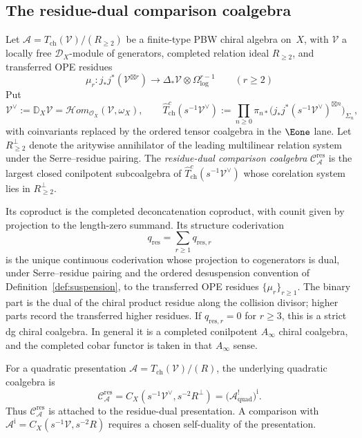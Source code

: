 
\subsection{The residue-dual comparison coalgebra}

\begin{definition}\label{def:koszul-dual-coalgebra}
\label{def:intrinsic-koszul-dual}
\label{def:koszul-dual-chiral}
Let $\mathcal{A}=T_{\mathrm{ch}}(\mathcal{V})/(R_{\geq 2})$ be a
finite-type PBW chiral algebra on~$X$, with $\mathcal{V}$ a locally free
$\mathcal{D}_X$-module of generators, completed relation ideal
$R_{\geq 2}$, and transferred OPE residues
\[
\mu_{r}\colon j_*j^*(\mathcal{V}^{\boxtimes r})
\longrightarrow \Delta_*\mathcal{V}\otimes
\Omega_{\log}^{r-1}
\qquad (r\geq 2)
\]
Put
\[
\mathcal{V}^{\vee}:=\mathbb D_X\mathcal V
=\mathcal{H}om_{\mathcal{O}_X}(\mathcal{V},\omega_X),
\qquad
\widehat{T}^{c}_{\mathrm{ch}}(s^{-1}\mathcal{V}^{\vee})
:=\prod_{n\geq 0}
\pi_{n*}\bigl(j_*j^*(s^{-1}\mathcal{V}^{\vee})^{\boxtimes n}\bigr)_{\Sigma_n},
\]
with coinvariants replaced by the ordered tensor coalgebra in the
$\Eone$ lane.  Let $R_{\geq2}^{\perp}$ denote the aritywise
annihilator of the leading multilinear relation system under the
Serre--residue pairing.  The \emph{residue-dual comparison
coalgebra} $\mathcal C_{\mathcal A}^{\mathrm{res}}$ is the largest
closed conilpotent subcoalgebra of
$\widehat{T}^{c}_{\mathrm{ch}}(s^{-1}\mathcal{V}^{\vee})$ whose
corelation system lies in $R_{\geq2}^{\perp}$.

Its coproduct is the completed deconcatenation coproduct, with counit
given by projection to the length-zero summand. Its structure
coderivation
\[
q_{\mathrm{res}}=\sum_{r\geq 1}q_{\mathrm{res},r}
\]
is the unique continuous coderivation whose projection to cogenerators
is dual, under Serre--residue pairing and the ordered desuspension
convention of Definition~\ref{def:suspension}, to the transferred OPE
residues
$\{\mu_r\}_{r\geq 1}$. The binary part is the dual of the chiral product
residue along the collision divisor; higher parts record the transferred
higher residues. If $q_{\mathrm{res},r}=0$ for $r\geq3$, this is a strict dg chiral
coalgebra. In general it is a completed conilpotent
$A_\infty$ chiral coalgebra, and the completed cobar functor is taken in
that $A_\infty$ sense.

For a quadratic presentation
$\mathcal A=T_{\mathrm{ch}}(\mathcal V)/(R)$, the underlying quadratic
coalgebra is
\[
 \mathcal C_{\mathcal A}^{\mathrm{res}}
 =C_X(s^{-1}\mathcal V^\vee,s^{-2}R^\perp)
 =\bigl(\mathcal A^!_{\mathrm{quad}}\bigr)^{\mathrm i}.
\]
Thus $\mathcal C_{\mathcal A}^{\mathrm{res}}$ is attached to the
residue-dual presentation.  A comparison with
$\mathcal A^{\mathrm i}=C_X(s^{-1}\mathcal V,s^{-2}R)$ requires a
chosen self-duality of the presentation.
\end{definition}

